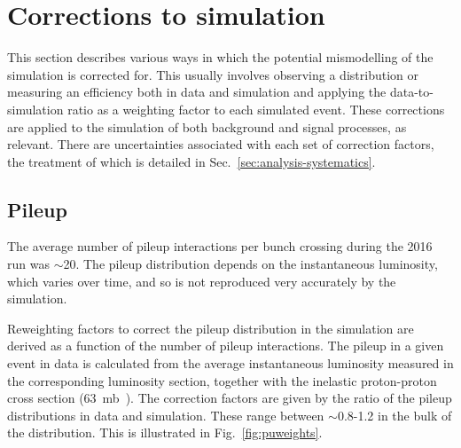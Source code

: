 \section{Corrections to simulation}
\label{sec:analysis-mccorrections}
This section describes various ways in which the potential mismodelling of the 
simulation is corrected for. This usually involves observing a distribution or 
measuring an efficiency both in data and simulation and applying the 
data-to-simulation ratio as a weighting factor to each simulated event. These 
corrections are applied to the simulation of both background and signal 
processes, as relevant.
There are uncertainties associated with each set of correction factors, the 
treatment of which is detailed in Sec.~\ref{sec:analysis-systematics}.


\subsection{Pileup}
\label{sec:analysis-mccorrections-pileup}

The average number of pileup interactions per bunch crossing during the 2016 
run was $\sim$20. The pileup distribution depends on the instantaneous 
luminosity, which varies over time, and so is not reproduced very accurately by 
the simulation.

Reweighting factors to correct the pileup distribution in the simulation are 
derived as a function of the number of pileup interactions. The pileup in a 
given event in data is calculated from the average instantaneous luminosity 
measured in the corresponding luminosity section, together with the inelastic 
proton-proton cross section (63~mb~\cite{inelasticxs-atlas13tev}). The 
correction factors are given by the ratio of the pileup distributions in data 
and simulation. These range between $\sim$0.8-1.2 in the bulk of the 
distribution. This is illustrated in Fig.~\ref{fig:puweights}. 

